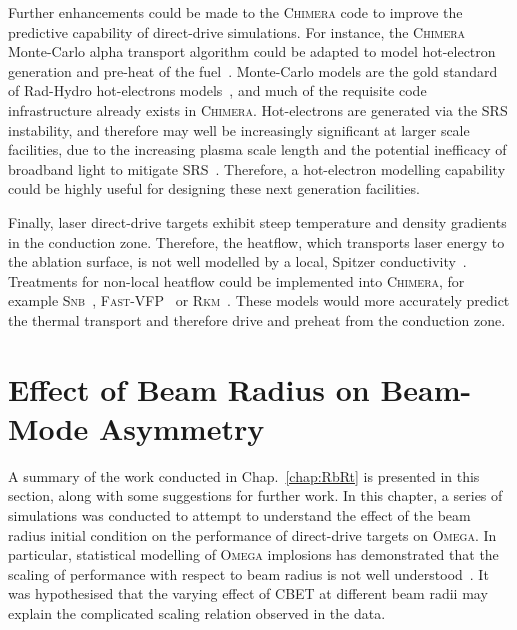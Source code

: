 Further enhancements could be made to the \textsc{Chimera} code to improve the predictive capability of direct-drive simulations.
For instance, the \textsc{Chimera} Monte-Carlo alpha transport algorithm could be adapted to model hot-electron generation and pre-heat of the fuel~\cite{tong_burn_2019}.
Monte-Carlo models are the gold standard of \ac{Rad-Hydro} hot-electrons models~\cite{barlow_role_2022,tentori_3d_2022,tentori_3d_2022a}, and much of the requisite code infrastructure already exists in \textsc{Chimera}.
Hot-electrons are generated via the \ac{SRS} instability, and therefore may well be increasingly significant at larger scale facilities, due to the increasing plasma scale length and the potential inefficacy of broadband light to mitigate \ac{SRS}~\cite{zhao_mitigation_2022}.
Therefore, a hot-electron modelling capability could be highly useful for designing these next generation facilities.

Finally, laser direct-drive targets exhibit steep temperature and density gradients in the conduction zone.
Therefore, the heatflow, which transports laser energy to the ablation surface, is not well modelled by a local, Spitzer conductivity~\cite{yuan_spacetime_2024}.
Treatments for non-local heatflow could be implemented into \textsc{Chimera}, for example \textsc{Snb}~\cite{schurtz_nonlocal_2000,nicolai_practical_2006,cao_improved_2015}, \textsc{Fast-VFP}~\cite{bell_fast_2024} or \textsc{Rkm}~\cite{mitchell_reduced_2024}.
These models would more accurately predict the thermal transport and therefore drive and preheat from the conduction zone.

\section{Effect of Beam Radius on Beam-Mode Asymmetry}

A summary of the work conducted in Chap.~\ref{chap:RbRt} is presented in this section, along with some suggestions for further work.
In this chapter, a series of simulations was conducted to attempt to understand the effect of the beam radius initial condition on the performance of direct-drive targets on \textsc{Omega}.
In particular, statistical modelling of \textsc{Omega} implosions has demonstrated that the scaling of performance with respect to beam radius is not well understood~\cite{lees_experimentally_2021,lees_understanding_2023}.
It was hypothesised that the varying effect of \ac{CBET} at different beam radii may explain the complicated scaling relation observed in the data.

